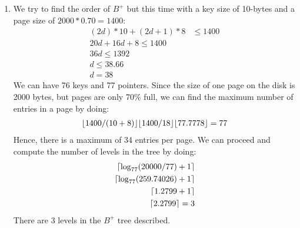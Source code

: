 \begin{enumerate}[label={(\alph*)}]
    \item We try to find the order of $B^+$ but this time with a key size of 10-bytes and a page size of $2000 * 0.70 = 1400$:
        \begin{align*}
        (2d)*10 + (2d + 1)*8 &\leq 1400\\
        20d + 16d + 8 \leq 1400\\
        36d \leq 1392 \\
        d \leq 38.66 \\
        d = 38
    \end{align*}
    \noindent We can have 76 keys and 77 pointers. Since the size of one page on the disk is 2000 bytes, but pages are only 70\% full, we can find the maximum number of entries in a page by doing:
    \begin{align*}
        \lfloor1400 / (10 + 8)\rfloor
        \lfloor1400 / 18\rfloor
        \lfloor77.7778\rfloor = 77
    \end{align*}
    \noindent Hence, there is a maximum of 34 entries per page. We can proceed and compute the number of levels in the tree by doing:
    \begin{align*}
        \lceil\log_{77}(20000/77) + 1\rceil\\
        \lceil\log_{77}(259.74026) + 1\rceil\\
        \lceil1.2799 + 1\rceil\\
        \lceil2.2799\rceil = 3
    \end{align*}
    \noindent There are 3 levels in the $B^+$ tree described.
\end{enumerate}